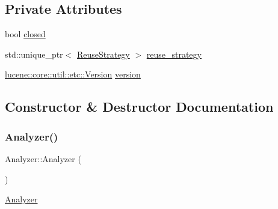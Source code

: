 \subsection*{Private Attributes}
\begin{DoxyCompactItemize}
\item 
bool \mbox{\hyperlink{classlucene_1_1core_1_1analysis_1_1Analyzer_a869f08194af89da7f8c68e211d73607c}{closed}}
\item 
std\+::unique\+\_\+ptr$<$ \mbox{\hyperlink{classlucene_1_1core_1_1analysis_1_1Analyzer_1_1ReuseStrategy}{Reuse\+Strategy}} $>$ \mbox{\hyperlink{classlucene_1_1core_1_1analysis_1_1Analyzer_a8c0924436e0392015b0b3df59d35717c}{reuse\+\_\+strategy}}
\item 
\mbox{\hyperlink{classlucene_1_1core_1_1util_1_1etc_1_1Version}{lucene\+::core\+::util\+::etc\+::\+Version}} \mbox{\hyperlink{classlucene_1_1core_1_1analysis_1_1Analyzer_ac04041d68279aa308509d8e8cfcf89e1}{version}}
\end{DoxyCompactItemize}


\subsection{Constructor \& Destructor Documentation}
\mbox{\label{classlucene_1_1core_1_1analysis_1_1Analyzer_a1be2ff17bba265bdef6e1b44748eaf96}} 
\subsubsection{\texorpdfstring{Analyzer()}{Analyzer()}\hspace{0.1cm}{\footnotesize\ttfamily [1/2]}}
{\footnotesize\ttfamily Analyzer\+::\+Analyzer (\begin{DoxyParamCaption}{ }\end{DoxyParamCaption})}

\mbox{\hyperlink{classlucene_1_1core_1_1analysis_1_1Analyzer}{Analyzer}} \mbox{\label{classlucene_1_1core_1_1analysis_1_1Analyzer_ae9dc5c7b575e336b14185cf403003bba}} 
